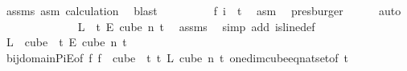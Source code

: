 \begin{isabellebody}
\ assms{\isacharparenleft}{\kern0pt}{}{\isacharparenright}{\kern0pt}\ asm\ calculation{\isacharparenleft}{\kern0pt}{}{\isacharparenright}{\kern0pt}\ \isamarkupfalse%
\ blast\isanewline
\ \ \ \ \ \ \isamarkupfalse%
\ \isamarkupfalse%
\ {\isachardoublequoteopen}{\isacharquery}{\kern0pt}f\ i\ {\isasymin}\ {\isacharbraceleft}{\kern0pt}{\isachardot}{\kern0pt}{\isachardot}{\kern0pt}{\isacharless}{\kern0pt}t{\isacharbraceright}{\kern0pt}{\isachardoublequoteclose}\ \isamarkupfalse%
\ asm\ \isamarkupfalse%
\ presburger\isanewline
\ \ \ \ \isamarkupfalse%
\ {\isacharparenleft}{\kern0pt}auto{\isacharparenright}{\kern0pt}\isanewline
\ \ \isacommand{{\isacharbraceright}{\kern0pt}}\isamarkupfalse%
\isanewline
\isanewline
\ \ \isamarkupfalse%
\isanewline
\ \ \isacommand{{\isacharbraceleft}{\kern0pt}}\isamarkupfalse%
\isanewline
\ \ \ \ \isamarkupfalse%
\ {\isachardoublequoteopen}L\ {\isasymin}\ {\isacharbraceleft}{\kern0pt}{\isachardot}{\kern0pt}{\isachardot}{\kern0pt}{\isacharless}{\kern0pt}t{\isacharbraceright}{\kern0pt}\ {\isasymrightarrow}\isactrlsub E\ {\isacharparenleft}{\kern0pt}cube\ n\ t{\isacharparenright}{\kern0pt}{\isachardoublequoteclose}\ \isamarkupfalse%
\ assms{\isacharparenleft}{\kern0pt}{}{\isacharparenright}{\kern0pt}\ \isamarkupfalse%
\ {\isacharparenleft}{\kern0pt}simp\ add{\isacharcolon}{\kern0pt}\ is{\isacharunderscore}{\kern0pt}line{\isacharunderscore}{\kern0pt}def{\isacharparenright}{\kern0pt}\isanewline
\ \ \ \ \isamarkupfalse%
\ \isamarkupfalse%
\ {\isachardoublequoteopen}{\isacharquery}{\kern0pt}L\ {\isasymin}\ {\isacharparenleft}{\kern0pt}cube\ {}\ t{\isacharparenright}{\kern0pt}\ {\isasymrightarrow}\isactrlsub E\ {\isacharparenleft}{\kern0pt}cube\ n\ t{\isacharparenright}{\kern0pt}{\isachardoublequoteclose}\isanewline
\ \ \ \ \ \ \isamarkupfalse%
\ bij{\isacharunderscore}{\kern0pt}domain{\isacharunderscore}{\kern0pt}PiE{\isacharbrackleft}{\kern0pt}of\ {\isachardoublequoteopen}{\isacharparenleft}{\kern0pt}{\isasymlambda}f{\isachardot}{\kern0pt}\ f\ {}{\isacharparenright}{\kern0pt}{\isachardoublequoteclose}\ {\isachardoublequoteopen}{\isacharparenleft}{\kern0pt}cube\ {}\ t{\isacharparenright}{\kern0pt}{\isachardoublequoteclose}\ {\isachardoublequoteopen}{\isacharbraceleft}{\kern0pt}{\isachardot}{\kern0pt}{\isachardot}{\kern0pt}{\isacharless}{\kern0pt}t{\isacharbraceright}{\kern0pt}{\isachardoublequoteclose}\ {\isachardoublequoteopen}L{\isachardoublequoteclose}\ {\isachardoublequoteopen}cube\ n\ t{\isachardoublequoteclose}{\isacharbrackright}{\kern0pt}\ one{\isacharunderscore}{\kern0pt}dim{\isacharunderscore}{\kern0pt}cube{\isacharunderscore}{\kern0pt}eq{\isacharunderscore}{\kern0pt}nat{\isacharunderscore}{\kern0pt}set{\isacharbrackleft}{\kern0pt}of\ {\isachardoublequoteopen}t{\isachardoublequoteclose}{\isacharbrackright}{\kern0pt}\ \isamarkupfalse%

\end{isabellebody}

